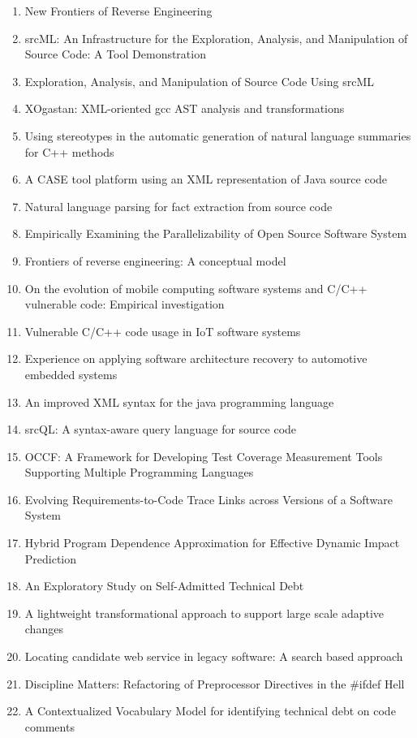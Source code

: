 \begin{enumerate}
\item New Frontiers of Reverse Engineering
\item srcML: An Infrastructure for the Exploration, Analysis, and Manipulation of Source Code: A Tool Demonstration
\item Exploration, Analysis, and Manipulation of Source Code Using srcML
\item XOgastan: XML-oriented gcc AST analysis and transformations
\item Using stereotypes in the automatic generation of natural language summaries for C++ methods
\item A CASE tool platform using an XML representation of Java source code
\item Natural language parsing for fact extraction from source code
\item Empirically Examining the Parallelizability of Open Source Software System
\item Frontiers of reverse engineering: A conceptual model
\item On the evolution of mobile computing software systems and C/C++ vulnerable code: Empirical investigation
\item Vulnerable C/C++ code usage in IoT software systems
\item Experience on applying software architecture recovery to automotive embedded systems
\item An improved XML syntax for the java programming language
\item srcQL: A syntax-aware query language for source code
\item OCCF: A Framework for Developing Test Coverage Measurement Tools Supporting Multiple Programming Languages
\item Evolving Requirements-to-Code Trace Links across Versions of a Software System
\item Hybrid Program Dependence Approximation for Effective Dynamic Impact Prediction
\item An Exploratory Study on Self-Admitted Technical Debt
\item A lightweight transformational approach to support large scale adaptive changes
\item Locating candidate web service in legacy software: A search based approach
\item Discipline Matters: Refactoring of Preprocessor Directives in the \#ifdef Hell
\item A Contextualized Vocabulary Model for identifying technical debt on code comments

\end{enumerate}
